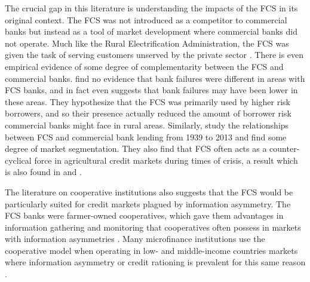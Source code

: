 \documentclass[12pt]{article}
\begin{document}
The crucial gap in this literature is understanding the impacts of the FCS in its original context.
The FCS was not introduced as a competitor to commercial banks but instead as a tool of market development where commercial banks did not operate.
Much like the Rural Electrification Administration, the FCS was given the task of serving customers unserved by the private sector \citep{kitchens2015flip,lewis2020short}.
There is even empirical evidence of some degree of complementarity between the FCS and commercial banks.
\citet{alston_why_1994} find no evidence that bank failures were different in areas with FCS banks, and in fact even suggests that bank failures may have been lower in these areas.
They hypothesize that the FCS was primarily used by higher risk borrowers, and so their presence actually reduced the amount of borrower risk commercial banks might face in rural areas.
Similarly, \citet{turvey_market_2020} study the relationships between FCS and commercial bank lending from 1939 to 2013 and find some degree of market segmentation.
They also find that FCS often acts as a counter-cyclical force in agricultural credit markets during times of crisis, a result which is also found in \citet{hartarska_agricultural_2015} and \citet{denis_farm_2017}.

The literature on cooperative institutions also suggests that the FCS would be particularly suited for credit markets plagued by information asymmetry. 
The FCS banks were farmer-owned cooperatives, which gave them advantages in information gathering and monitoring that cooperatives often possess in markets with information asymmetries \citep{hueth2015agents,besley1995group,guinnane2001cooperatives}.
Many microfinance institutions use the cooperative model when operating in low- and middle-income countries markets where information asymmetry or credit rationing is prevalent for this same reason \citep{besley_how_1994}.
\end{document}
